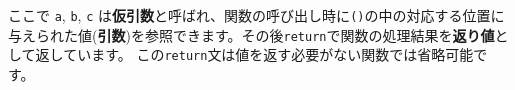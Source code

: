 \begin{Shaded}
\begin{Highlighting}[]
 \OperatorTok{,}\OperatorTok{,}
  \OperatorTok{=}\OperatorTok{**}  \OperatorTok{{-}}  \OperatorTok{*}\OperatorTok{*}\OperatorTok{;}
  \OperatorTok{===} \NormalTok{) \{}
    \NormalTok{ \{}
      \OperatorTok{:} \OperatorTok{,}
      \OperatorTok{:}\NormalTok{ [b }\OperatorTok{/}\NormalTok{ (} \OperatorTok{*}\NormalTok{ a)]}
\NormalTok{    \}}\OperatorTok{;}
\NormalTok{  \} } \OperatorTok{\textgreater{}} \NormalTok{) \{}
    \NormalTok{ \{}
      \OperatorTok{:} \OperatorTok{,}
      \OperatorTok{:}\NormalTok{ [}
\OperatorTok{+} \OperatorTok{/}\NormalTok{ (} \OperatorTok{*}\OperatorTok{,}
\OperatorTok{{-}} \OperatorTok{/}\NormalTok{ (} \OperatorTok{*}
\NormalTok{      ]}
\NormalTok{    \}}\OperatorTok{;}
\NormalTok{  \} }\NormalTok{ \{}
    \NormalTok{ \{}
      \OperatorTok{:} \OperatorTok{,}
      \OperatorTok{:}\NormalTok{ [}
        \VerbatimStringTok{\textasciigrave{}(}\SpecialCharTok{$\{}\SpecialCharTok{\}}\SpecialCharTok{$\{}\SpecialCharTok{\}}\SpecialCharTok{$\{} \OperatorTok{*}\SpecialCharTok{\}}\VerbatimStringTok{\textasciigrave{}}
\NormalTok{      ]}
\NormalTok{    \}}\OperatorTok{;}
\NormalTok{  \}}
\NormalTok{\}}
\end{Highlighting}
\end{Shaded}

ここで \texttt{a}, \texttt{b}, \texttt{c}
は\textbf{仮引数}と呼ばれ、関数の呼び出し時に\texttt{()}の中の対応する位置に与えられた値(\textbf{引数})を参照できます。その後\texttt{return}で関数の処理結果を\textbf{返り値}として返しています。
この\texttt{return}文は値を返す必要がない関数では省略可能です。

